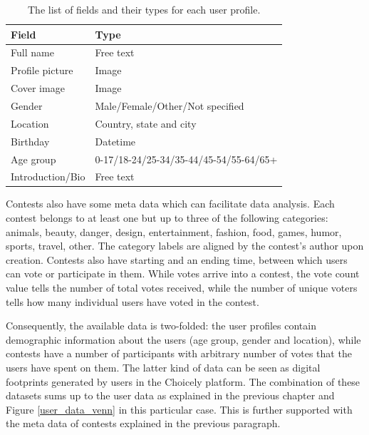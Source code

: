     \begin{table}[]
        \centering
        \begin{tabular}{l|l}
            \textbf{Field}              & \textbf{Type} \\
            \hline
            Full name                   & Free text \\
            Profile picture             & Image \\ 
            Cover image                 & Image \\
            Gender                      & Male/Female/Other/Not specified \\
            Location                    & Country, state and city \\
            Birthday                    & Datetime \\ 
            Age group                   & 0-17/18-24/25-34/35-44/45-54/55-64/65+ \\
            Introduction/Bio            & Free text
        \end{tabular}
        \caption{The list of fields and their types for each user profile.}
        \label{user_profile_fields}
    \end{table}

    Contests also have some meta data which can facilitate data analysis. Each contest belongs to at least one but up to three of the following categories: animals, beauty, danger, design, entertainment, fashion, food, games, humor, sports, travel, other. The category labels are aligned by the contest's author upon creation. Contests also have starting and an ending time, between which users can vote or participate in them. While votes arrive into a contest, the vote count value tells the number of total votes received, while the number of unique voters tells how many individual users have voted in the contest.   

    Consequently, the available data is two-folded: the user profiles contain demographic information about the users (age group, gender and location), while contests have a number of participants with arbitrary number of votes that the users have spent on them. The latter kind of data can be seen as digital footprints generated by users in the Choicely platform. The combination of these datasets sums up to the user data as explained in the previous chapter and Figure \ref{user_data_venn} in this particular case. This is further supported with the meta data of contests explained in the previous paragraph. 

